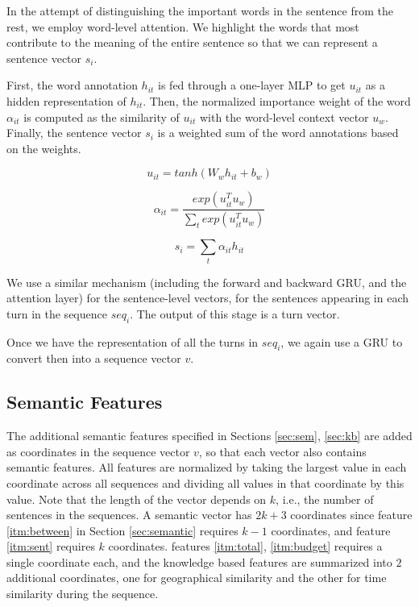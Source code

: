 In the attempt of distinguishing the important 
words in the sentence from the rest, we employ word-level 
attention. We highlight the words that most contribute 
to the meaning of the entire sentence so that we can represent 
a sentence vector $s_i$. 

First, the word annotation $h_{it}$ is fed 
through a one-layer MLP to get $u_{it}$ as a hidden representation
of $h_{it}$. Then, the normalized importance weight of the word $\alpha_{it}$ 
is computed as the similarity of $u_{it}$ with the word-level 
context vector $u_w$. 
Finally, the sentence vector $s_i$ is a weighted sum of the word annotations
based on the weights. 

\begin{equation*}
	u_{it} = tanh(W_w h_{it} + b_w)
\end{equation*}

\begin{equation*}
	\alpha_{it} = \frac{exp(u^T_{it} u_w)}{\sum_t exp(u^T_{it} u_w)}
\end{equation*}

\begin{equation*}
	s_i = \sum_{t} \alpha_{it} h_{it}
\end{equation*}

We use a similar mechanism (including the forward and backward 
GRU, and the attention layer) for the sentence-level vectors, 
for the sentences appearing in each turn in the sequence $seq_i$. 
The output of this stage is a turn vector. 

Once we have the representation of all the turns in $seq_i$, 
we again use a GRU to convert then into a sequence vector $v$. 

\subsection{Semantic Features}
The additional semantic features specified 
in Sections \ref{sec:sem}, \ref{sec:kb} 
are added as coordinates in the sequence vector $v$, so that 
each vector also contains semantic features. 
All features are normalized by taking the largest 
value in each coordinate across all sequences and dividing 
all values in that coordinate by this value.  
Note that the length of the vector depends on $k$, 
i.e., the number of sentences in the sequences. 
A semantic vector has $2k+3$ coordinates since feature \ref{itm:between} in Section \ref{sec:semantic} requires $k-1$ coordinates, and 
feature \ref{itm:sent} requires $k$ coordinates. 
features \ref{itm:total}, \ref{itm:budget} requires a single coordinate each, 
and the knowledge based features are summarized into $2$ additional coordinates, 
one for geographical similarity and the other for time similarity during the sequence. 

